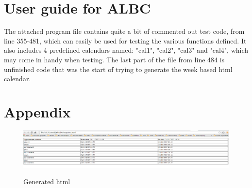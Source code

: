 \documentclass{IOS-Book-Article}
\begin{document}
\section{User guide for ALBC} \label{sec:userguide}
The attached program file contains quite a bit of commented out test code, from line 355-481, which can easily be used for testing the various functions defined. It also includes 4 predefined calendars named: "cal1", "cal2", "cal3" and "cal4", which may come in handy when testing. The last part of the file from line 484 is unfinished code that was the start of trying to generate the week based html calendar.


\section{Appendix}
\begin{figure}
\includegraphics[scale=0.4]{./pic.png}
\label{sec:generatedhtml}
\caption{Generated html}
\end{figure}



%




 


\end{document}
